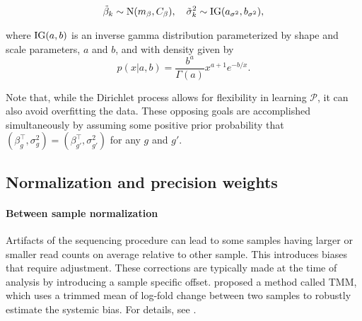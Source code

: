 \begin{equation}
\tilde{\beta}_k \sim \operatorname{N}(m_\beta, C_\beta),\quad \tilde{\sigma}^2_k \sim \operatorname{IG}(a_{\sigma^2}, b_{\sigma^2}),
\end{equation}

where $\operatorname{IG}(a,b)$ is an inverse gamma distribution parameterized by shape and scale parameters, $a$ and $b$, and with density given by
\begin{equation*}
p(x|a,b) = \frac{b^a}{\Gamma(a)}x^{a+1}e^{-b/x}.
\end{equation*}

Note that, while the Dirichlet process allows for flexibility in learning $\mathcal{P}$, it can also avoid overfitting the data. These opposing goals are accomplished simultaneously by assuming some positive prior probability that $(\beta_g^\top,\sigma_g^2)=(\beta_{g'}^\top,\sigma_{g'}^2)$ for any $g$ and $g'$.

%
%
%

\subsection{Normalization and precision weights}
\label{norm-weight}
\paragraph{Between sample normalization}
Artifacts of the sequencing procedure can lead to some samples having larger or smaller read counts on average relative to other sample. This introduces biases that require adjustment. These corrections are typically made at the time of analysis by introducing a sample specific offset. \citet{robinson2010} proposed a method called TMM, which uses a trimmed mean of log-fold change between two samples to robustly estimate the systemic bias. For details, see \citet{robinson2010}.

